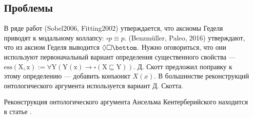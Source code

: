 \documentclass[openany]{book}
\theoremstyle{plain}
\theoremstyle{definition}
\begin{document}
\subsection{Проблемы}

В ряде работ (Sobel2006, Fitting2002) утверждается, что аксиомы Геделя приводят к модальному коллапсу: \(\square p \equiv p\). (Benzm\"{u}ller, Paleo, 2016) утверждают, что из аксиом Геделя выводится \(\Diamond \square \bottom\). Нужно оговориться, что они используют первоначальный вариант определения существенного свойства --- \(\mathrm{ess(X, x) := \forall Y (Y(x) \to \square (X \sqsubseteq Y))}\). Д. Скотт предложил поправку к этому определению --- добавить конъюнкт \(X(x)\). В большинстве реконструкций онтологического аргумента используется вариант Д. Скотта.

Реконструкция онтологического аргумента Ансельма Кентерберийского находится в статье \cite{Ramharter}.
\end{document}
